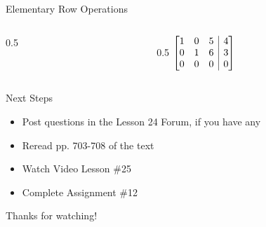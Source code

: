 \documentclass[t, aspectratio=169]{beamer}
\makeatletter
\newenvironment{amatrix}[1]{%
	\left[\begin{array}{@{}*{#1}{c}|c@{}}
	}{%
	\end{array}\right]
}
\makeatother
\begin{document}
\begin{frame}{Elementary Row Operations}
\begin{columns}
\begin{column}{0.5\textwidth}
				\only<6>{$\begin{amatrix}{3}
					1 & 0 & 5 & 4 \\ 0 & 1 & 6 & 3 \\ 0 & 1 & 6 & 3
					\end{amatrix}$
				}
			
				\only<7->{$\begin{amatrix}{3}
					1 & 0 & 5 & 4 \\ 0 & 1 & 6 & 3 \\ 0 & 0 & 0 & 0
					\end{amatrix}$
				}
			\end{column}
			\begin{column}{0.5\textwidth}
				$\begin{amatrix}{3}
				1 & 0 & 5 & 4 \\ 0 & 1 & 6 & 3 \\ 0 & 0 & 0 & 0
				\end{amatrix}$ \vspace{32pt}
				
			\end{column}
		\end{columns} \vspace{8pt}
	
	\end{frame}

	\begin{frame}{Next Steps}
		\begin{itemize}
			\item Post questions in the Lesson 24 Forum, if you have any
			\item Reread pp. 703-708 of the text
			\item Watch Video Lesson \#25
			\item Complete Assignment \#12
		\end{itemize}
	
		\vfill
		
		Thanks for watching!
	\end{frame}
	
\end{document}

